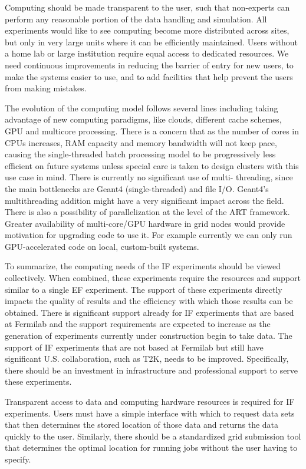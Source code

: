 \begin{itemize}
Computing should be made transparent to the user, such that non-experts can
perform any reasonable portion of the data handling and simulation. All
experiments would like to see computing become more distributed across sites,
but only in very large units where it can be efficiently maintained.  Users
without a home lab or large institution require equal access to dedicated
resources. We need  continuous improvements in reducing the barrier of entry
for new users, to make the systems easier to use, and to add facilities that
help prevent the users from making mistakes.

The evolution of the computing model follows several lines including taking
advantage of new computing paradigms, like clouds, different cache schemes,
GPU and multicore processing.   There is a concern that as the number of cores
in CPUs increases, RAM capacity and memory bandwidth will not keep pace,
causing the single-threaded batch processing model to be progressively less
efficient on future systems unless special care is taken to design clusters
with this use case in mind. There is currently no significant use of multi-
threading, since the main bottlenecks are Geant4 (single-threaded) and file
I/O. Geant4's multithreading addition might have a very significant impact
across the field. There is also a possibility of parallelization at the level
of the ART framework. Greater availability of multi-core/GPU hardware in grid
nodes would provide motivation for upgrading code to use it. For example
currently we can only run GPU-accelerated code on local, custom-built systems.

\end{itemize}

To summarize, the computing needs of the IF experiments should be viewed
collectively.  When combined, these experiments require the resources and
support similar to a single EF experiment.  The support of these experiments
directly impacts the quality of results and the efficiency with which those
results can be obtained.  There is significant support already for IF
experiments that are based at Fermilab and the support requirements are
expected to increase as the generation of experiments currently under
construction begin to take data.  The support of IF experiments that are not
based at Fermilab but still have significant U.S. collaboration, such as T2K,
needs to be improved.  Specifically, there should be an investment in
infrastructure and professional support to serve these experiments.

Transparent access to data and computing hardware resources is required for IF
experiments.   Users must have a simple interface with which to request data
sets that then determines the stored location of those data and returns the
data quickly to the user.  Similarly, there should be a standardized grid
submission tool that determines the optimal location for running jobs without
the user having to specify.

